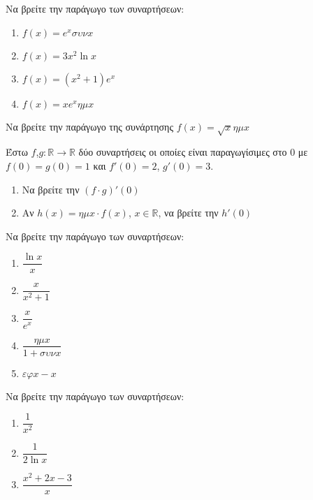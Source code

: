 \documentclass{presentation}
\begin{document}
\begin{askisi}
  Να βρείτε την παράγωγο των συναρτήσεων:
  \begin{enumerate}
    \item<1-> $f(x)=e^xσυνx$
    \item<2-> $f(x)=3x^2\ln x$
    \item<3-> $f(x)=(x^2+1)e^x$
    \item<4-> $f(x)=xe^xημx$
  \end{enumerate}

\end{askisi}

\begin{askisi}
  Να βρείτε την παράγωγο της συνάρτησης $f(x)=\sqrt{x}ημx$

\end{askisi}

\begin{askisi}
  Έστω $f$,$g:\mathbb{R}\to\mathbb{R}$ δύο συναρτήσεις οι οποίες είναι παραγωγίσιμες στο $0$ με $f(0)=g(0)=1$ και $f'(0)=2$, $g'(0)=3$.

  \begin{enumerate}
    \item<1-> Να βρείτε την $(f\cdot g)'(0)$
    \item<2-> Αν $h(x)=ημx \cdot f(x)$, $x\in\mathbb{R}$, να βρείτε την $h'(0)$
  \end{enumerate}

\end{askisi}

\begin{askisi}
  Να βρείτε την παράγωγο των συναρτήσεων:
  \begin{enumerate}
    \item<1-> $\dfrac{\ln x}{x}$
    \item<2-> $\dfrac{x}{x^2+1}$
    \item<3-> $\dfrac{x}{e^x}$
    \item<4-> $\dfrac{ημx}{1+συνx}$
    \item<5-> $εφx-x$
  \end{enumerate}

\end{askisi}

\begin{askisi}
  Να βρείτε την παράγωγο των συναρτήσεων:
  \begin{enumerate}
    \item<1-> $\dfrac{1}{x^2}$
    \item<2-> $\dfrac{1}{2\ln x}$
    \item<3-> $\dfrac{x^2+2x-3}{x}$
  \end{enumerate}

\end{askisi}
\end{document}
